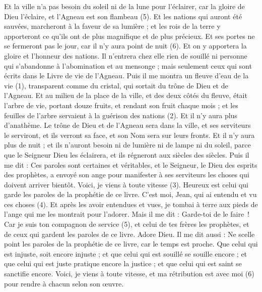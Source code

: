 \begin{multicols}{2}
Et la ville n'a pas besoin du soleil ni de la lune pour l’éclairer, car la gloire de Dieu l’éclaire, et l'Agneau est son flambeau (5).
Et les nations qui auront été sauvées, marcheront à la faveur de sa lumière ; et les rois de la terre y apporteront ce qu'ils ont de plus magnifique et de plus précieux.
Et ses portes ne se fermeront pas le jour, car il n'y aura point de nuit (6).
Et on y apportera la gloire et l’honneur des nations.
Il n’entrera chez elle rien de souillé ni personne qui s'abandonne à l'abomination et au mensonge ; mais seulement ceux qui sont écrits dans le Livre de vie de l'Agneau.
\VerseOne{}Puis il me montra un fleuve d'eau de la vie (1), transparent comme du cristal, qui sortait du trône de Dieu et de l'Agneau.
Et au milieu de la place de la ville, et des deux côtés du fleuve, était l'arbre de vie, portant douze fruits, et rendant son fruit chaque mois ; et les feuilles de l'arbre servaient à la guérison des nations (2).
Et il n’y aura plus d’anathème. Le trône de Dieu et de l'Agneau sera dans la ville, et ses serviteurs le serviront,
et ils verront sa face, et son Nom sera sur leurs fronts.
Et il n'y aura plus de nuit ; et ils n’auront besoin ni de lumière ni de lampe ni du soleil, parce que le Seigneur Dieu les éclairera, et ils régneront aux siècles des siècles.
Puis il me dit : Ces paroles sont certaines et véritables, et le Seigneur, le Dieu des esprits des prophètes, a envoyé son ange pour manifester à ses serviteurs les choses qui doivent arriver bientôt.
Voici, je viens à toute vitesse (3). Heureux est celui qui garde les paroles de la prophétie de ce livre.
C’est moi, Jean, qui ai entendu et vu ces choses (4). Et après les avoir entendues et vues, je tombai à terre aux pieds de l’ange qui me les montrait pour l’adorer.
Mais il me dit : Garde-toi de le faire ! Car je suis ton compagnon de service (5), et celui de tes frères les prophètes, et de ceux qui gardent les paroles de ce livre. Adore Dieu.
Il me dit aussi : Ne scelle point les paroles de la prophétie de ce livre, car le temps est proche.
Que celui qui est injuste, soit encore injuste ; et que celui qui est souillé se souille encore ; et que celui qui est juste pratique encore la justice ; et que celui qui est saint se sanctifie encore.
Voici, je viens à toute vitesse, et ma rétribution est avec moi (6) pour rendre à chacun selon son œuvre.

\end{multicols}
